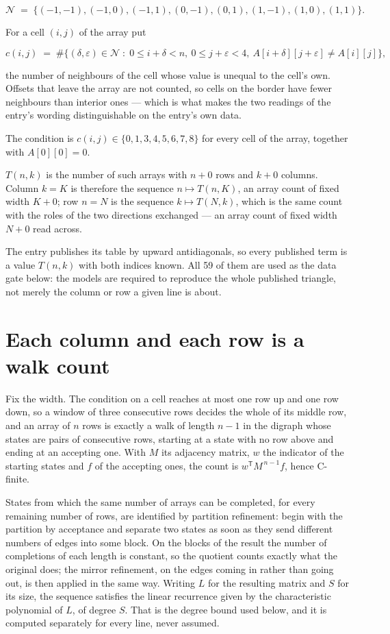 \documentclass[11pt]{article}
\theoremstyle{definition}
\begin{document}
\[\mathcal{N} \;=\; \{(-1,-1), (-1,0), (-1,1), (0,-1), (0,1), (1,-1), (1,0), (1,1)\}.\]

For a cell $(i,j)$ of the array put

\[c(i,j) \;=\; \#\bigl\{(\delta,\varepsilon)\in\mathcal{N} \;:\; 0\le i+\delta<n,\ 0\le j+\varepsilon<4,\ A[i+\delta][j+\varepsilon] \neq A[i][j]\bigr\},\]

the number of neighbours of the cell whose value is unequal to the cell's own. Offsets that leave the array are not counted, so cells on the border have fewer neighbours than interior ones --- which is what makes the two readings of the entry's wording distinguishable on the entry's own data.

The condition is $c(i,j) \in \{0, 1, 3, 4, 5, 6, 7, 8\}$ for every cell of the array, together with $A[0][0]=0$.

$T(n,k)$ is the number of such arrays with $n + 0$ rows and $k + 0$ columns. Column $k = K$ is therefore the sequence $n \mapsto T(n,K)$, an array count of fixed width $K + 0$; row $n = N$ is the sequence $k \mapsto T(N,k)$, which is the same count with the roles of the two directions exchanged --- an array count of fixed width $N + 0$ read across.

The entry publishes its table by upward antidiagonals, so every published term is a value $T(n,k)$ with both indices known. All 59 of them are used as the data gate below: the models are required to reproduce the whole published triangle, not merely the column or row a given line is about.

\section{Each column and each row is a walk count}

Fix the width. The condition on a cell reaches at most one row up and one row down, so a window of three consecutive rows decides the whole of its middle row, and an array of $n$ rows is exactly a walk of length $n-1$ in the digraph whose states are pairs of consecutive rows, starting at a state with no row above and ending at an accepting one. With $M$ its adjacency matrix, $w$ the indicator of the starting states and $f$ of the accepting ones, the count is $w^{\mathsf T}M^{\,n-1}f$, hence C-finite.

States from which the same number of arrays can be completed, for every remaining number of rows, are identified by partition refinement: begin with the partition by acceptance and separate two states as soon as they send different numbers of edges into some block. On the blocks of the result the number of completions of each length is constant, so the quotient counts exactly what the original does; the mirror refinement, on the edges coming in rather than going out, is then applied in the same way. Writing $L$ for the resulting matrix and $S$ for its size, the sequence satisfies the linear recurrence given by the characteristic polynomial of $L$, of degree $S$. That is the degree bound used below, and it is computed separately for every line, never assumed.
\end{document}

